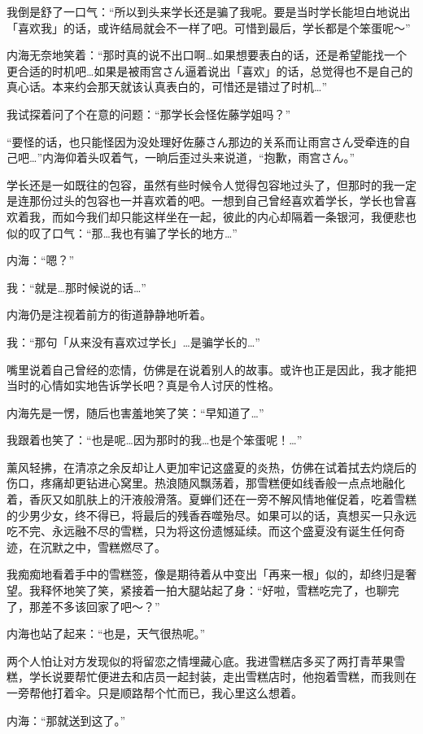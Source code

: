 我倒是舒了一口气：“所以到头来学长还是骗了我呢。要是当时学长能坦白地说出「喜欢我」的话，或许结局就会不一样了吧。可惜到最后，学长都是个笨蛋呢～”

内海无奈地笑着：“那时真的说不出口啊…如果想要表白的话，还是希望能找一个更合适的时机吧…如果是被雨宫さん逼着说出「喜欢」的话，总觉得也不是自己的真心话。本来约会那天就该认真表白的，可惜还是错过了时机…”

我试探着问了个在意的问题：“那学长会怪佐藤学姐吗？”

“要怪的话，也只能怪因为没处理好佐藤さん那边的关系而让雨宫さん受牵连的自己吧…”内海仰着头叹着气，一晌后歪过头来说道，“抱歉，雨宫さん。”

学长还是一如既往的包容，虽然有些时候令人觉得包容地过头了，但那时的我一定是连那份过头的包容也一并喜欢着的吧。一想到自己曾经喜欢着学长，学长也曾喜欢着我，而如今我们却只能这样坐在一起，彼此的内心却隔着一条银河，我便悲也似的叹了口气：“那…我也有骗了学长的地方…”

内海：“嗯？”

我：“就是…那时候说的话…”

内海仍是注视着前方的街道静静地听着。

我：“那句「从来没有喜欢过学长」…是骗学长的…”

嘴里说着自己曾经的恋情，仿佛是在说着别人的故事。或许也正是因此，我才能把当时的心情如实地告诉学长吧？真是令人讨厌的性格。

内海先是一愣，随后也害羞地笑了笑：“早知道了…”

我跟着也笑了：“也是呢…因为那时的我…也是个笨蛋呢！…”

薰风轻拂，在清凉之余反却让人更加牢记这盛夏的炎热，仿佛在试着拭去灼烧后的伤口，疼痛却更钻进心窝里。热浪随风飘荡着，那雪糕便如线香般一点点地融化着，香灰又如肌肤上的汗液般滑落。夏蝉们还在一旁不解风情地催促着，吃着雪糕的少男少女，终不得已，将最后的残香吞噬殆尽。如果可以的话，真想买一只永远吃不完、永远融不尽的雪糕，只为将这份遗憾延续。而这个盛夏没有诞生任何奇迹，在沉默之中，雪糕燃尽了。

我痴痴地看着手中的雪糕签，像是期待着从中变出「再来一根」似的，却终归是奢望。我释怀地笑了笑，紧接着一拍大腿站起了身：“好啦，雪糕吃完了，也聊完了，那差不多该回家了吧～？”

内海也站了起来：“也是，天气很热呢。”

两个人怕让对方发现似的将留恋之情埋藏心底。我进雪糕店多买了两打青苹果雪糕，学长说要帮忙便进去和店员一起封装，走出雪糕店时，他抱着雪糕，而我则在一旁帮他打着伞。只是顺路帮个忙而已，我心里这么想着。

内海：“那就送到这了。”

